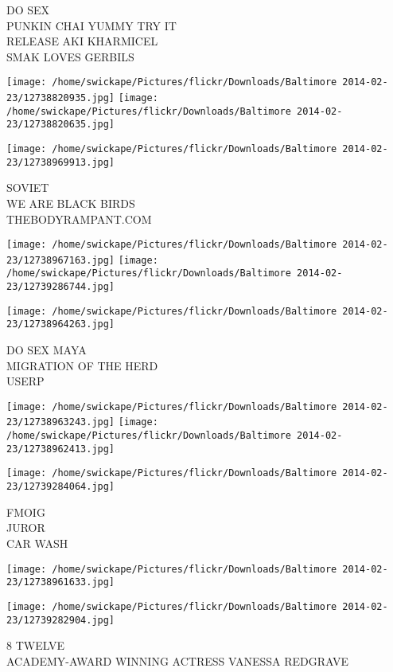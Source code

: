 \documentclass[10pt,letterpaper]{article}
\begin{document}
DO SEX\\
PUNKIN CHAI YUMMY TRY IT\\
RELEASE AKI KHARMICEL\\
SMAK LOVES GERBILS
\pagebreak

\texttt{[image: /home/swickape/Pictures/flickr/Downloads/Baltimore 2014-02-23/12738820935.jpg]}
\texttt{[image: /home/swickape/Pictures/flickr/Downloads/Baltimore 2014-02-23/12738820635.jpg]}

\vspace{0.25in}
\texttt{[image: /home/swickape/Pictures/flickr/Downloads/Baltimore 2014-02-23/12738969913.jpg]}

SOVIET\\
WE ARE BLACK BIRDS\\
THEBODYRAMPANT.COM
\pagebreak

\texttt{[image: /home/swickape/Pictures/flickr/Downloads/Baltimore 2014-02-23/12738967163.jpg]}
\texttt{[image: /home/swickape/Pictures/flickr/Downloads/Baltimore 2014-02-23/12739286744.jpg]}

\vspace{0.25in}
\texttt{[image: /home/swickape/Pictures/flickr/Downloads/Baltimore 2014-02-23/12738964263.jpg]}

DO SEX MAYA\\
MIGRATION OF THE HERD\\
USERP
\pagebreak

\texttt{[image: /home/swickape/Pictures/flickr/Downloads/Baltimore 2014-02-23/12738963243.jpg]}
\texttt{[image: /home/swickape/Pictures/flickr/Downloads/Baltimore 2014-02-23/12738962413.jpg]}

\texttt{[image: /home/swickape/Pictures/flickr/Downloads/Baltimore 2014-02-23/12739284064.jpg]}

FMOIG\\
JUROR\\
CAR WASH
\pagebreak

\texttt{[image: /home/swickape/Pictures/flickr/Downloads/Baltimore 2014-02-23/12738961633.jpg]}

\vspace{0.25in}
\texttt{[image: /home/swickape/Pictures/flickr/Downloads/Baltimore 2014-02-23/12739282904.jpg]}

8 TWELVE\\
ACADEMY{-}AWARD WINNING ACTRESS VANESSA REDGRAVE
\pagebreak
\end{document}
